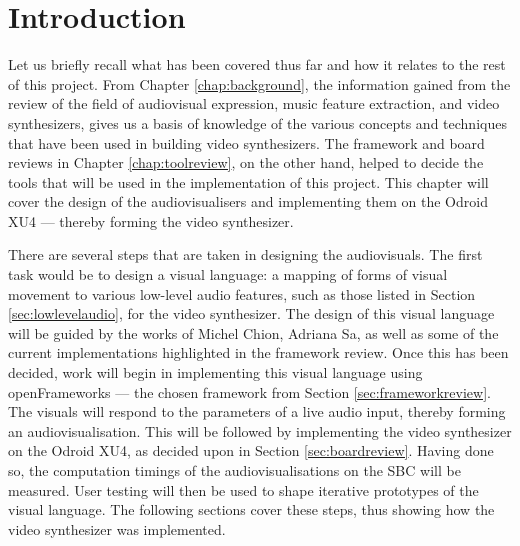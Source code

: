 \documentclass[../initial_thesis.tex]{subfiles}
\begin{document}
\section{Introduction}
Let us briefly recall what has been covered thus far and how it relates to the rest of this project. From Chapter \ref{chap:background}, the information gained from the review of the field of audiovisual expression, music feature extraction, and video synthesizers, gives us a basis of knowledge of the various concepts and techniques that have been used in building video synthesizers. The framework and board reviews in Chapter \ref{chap:toolreview}, on the other hand, helped to decide the tools that will be used in the implementation of this project. This chapter will cover the design of the audiovisualisers and implementing them on the Odroid XU4 --- thereby forming the video synthesizer. \par

There are several steps that are taken in designing the audiovisuals. The first task would be to design a visual language: a mapping of forms of visual movement to various low-level audio features, such as those listed in Section \ref{sec:lowlevelaudio}, for the video synthesizer. The design of this visual language will be guided by the works of Michel Chion, Adriana Sa, as well as some of the current implementations highlighted in the framework review. Once this has been decided, work will begin in implementing this visual language using openFrameworks --- the chosen framework from Section \ref{sec:frameworkreview}. The visuals will respond to the parameters of a live audio input, thereby forming an audiovisualisation. This will be followed by implementing the video synthesizer on the Odroid XU4, as decided upon in Section \ref{sec:boardreview}. Having done so, the computation timings of the audiovisualisations on the SBC will be measured. User testing will then be used to shape iterative prototypes of the visual language. The following sections cover these steps, thus showing how the video synthesizer was implemented. 
\end{document}
